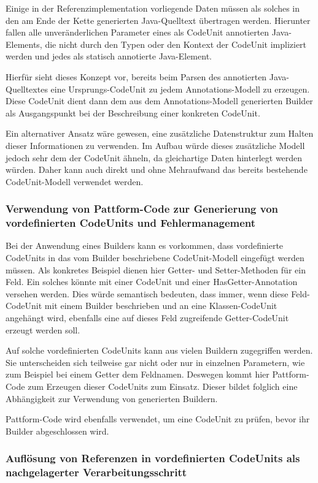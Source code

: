 \documentclass[12pt,oneside,a4paper,parskip]{scrbook}
\begin{document}
Einige in der Referenzimplementation vorliegende Daten müssen als solches in den am Ende der Kette generierten Java-Quelltext übertragen werden. Hierunter fallen alle unveränderlichen Parameter eines als CodeUnit annotierten Java-Elements, die nicht durch den Typen oder den Kontext der CodeUnit impliziert werden und jedes als statisch annotierte Java-Element.

Hierfür sieht dieses Konzept vor, bereits beim Parsen des annotierten Java-Quelltextes eine Ursprungs-CodeUnit zu jedem Annotations-Modell zu erzeugen. Diese CodeUnit dient dann dem aus dem Annotations-Modell generierten Builder als Ausgangspunkt bei der Beschreibung einer konkreten CodeUnit.

Ein alternativer Ansatz wäre gewesen, eine zusätzliche Datenstruktur zum Halten dieser Informationen zu verwenden. Im Aufbau würde dieses zusätzliche Modell jedoch sehr dem der CodeUnit ähneln, da gleichartige Daten hinterlegt werden würden. Daher kann auch direkt und ohne Mehraufwand das bereits bestehende CodeUnit-Modell verwendet werden.

\subsubsection{Verwendung von Pattform-Code zur Generierung von vordefinierten CodeUnits und Fehlermanagement}

Bei der Anwendung eines Builders kann es vorkommen, dass vordefinierte CodeUnits in das vom Builder beschriebene CodeUnit-Modell eingefügt werden müssen. Als konkretes Beispiel dienen hier Getter- und Setter-Methoden für ein Feld. Ein solches könnte mit einer CodeUnit und einer HasGetter-Annotation versehen werden. Dies würde semantisch bedeuten, dass immer, wenn diese Feld-CodeUnit mit einem Builder beschrieben und an eine Klassen-CodeUnit angehängt wird, ebenfalls eine auf dieses Feld zugreifende Getter-CodeUnit erzeugt werden soll.

Auf solche vordefinierten CodeUnits kann aus vielen Buildern zugegriffen werden. Sie unterscheiden sich teilweise gar nicht oder nur in einzelnen Parametern, wie zum Beispiel bei einem Getter dem Feldnamen. Deswegen kommt hier Pattform-Code zum Erzeugen dieser CodeUnits zum Einsatz. Dieser bildet folglich eine Abhängigkeit zur Verwendung von generierten Buildern.

Pattform-Code wird ebenfalls verwendet, um eine CodeUnit zu prüfen, bevor ihr Builder abgeschlossen wird.

\subsubsection{Auflösung von Referenzen in vordefinierten CodeUnits als nachgelagerter Verarbeitungsschritt}
\end{document}
